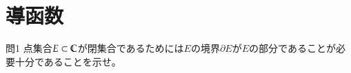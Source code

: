 \chapter{導函数}%

\begin{mysimplebox}{問1}
    点集合$E\subset\mathbb{C}$が閉集合であるためには$E$の境界$\partial E$が$E$の部分であることが必要十分であることを示せ。 
\end{mysimplebox}